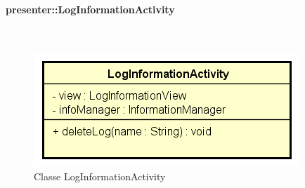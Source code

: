 \documentclass[../DefinizioneDiProdotto.tex]{subfiles}
\begin{document}
\paragraph{presenter::LogInformationActivity}
\
\begin{figure}[H]
	\centering
	\includegraphics[width=\maxwidth]{img/LogInformationActivity.png}
	\caption{Classe LogInformationActivity}\label{fig:presenter::LogInformationActivity} 
\end{figure}
\end{document}
